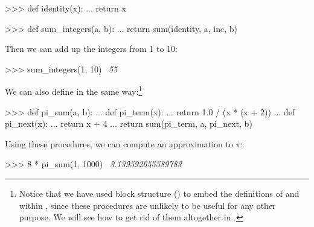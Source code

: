 \begin{codeBlock}
>>> def identity(x):
...     return x

>>> def sum_integers(a, b):
...     return sum(identity, a, inc, b)
\end{codeBlock}

\noindent
Then we can add up the integers from 1 to 10:

\begin{codeBlock}
>>> sum_integers(1, 10)
~\textit{55}~
\end{codeBlock}

\noindent
We can also define  in the same way:\footnote{Notice that we have
used block structure () to embed the definitions of
 and  within , since these
procedures are unlikely to be useful for any other purpose.  We will see how to get rid of
them altogether in .}

\begin{codeBlock}
>>> def pi_sum(a, b):
...     def pi_term(x):
...         return 1.0 / (x * (x + 2))
...     def pi_next(x):
...         return x + 4
...     return sum(pi_term, a, pi_next, b)
\end{codeBlock}

\noindent
Using these procedures, we can compute an approximation to \( \pi \):

\begin{codeBlock}
>>> 8 * pi_sum(1, 1000)
~\textit{3.139592655589783}~
\end{codeBlock}


